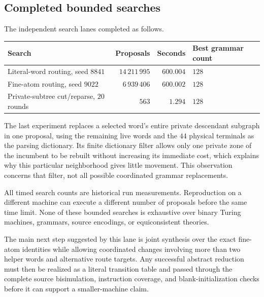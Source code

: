\subsection{Completed bounded searches}

The independent search lanes completed as follows.
\begin{center}
\begin{tabular}{@{}lrrl@{}}
\toprule
Search & Proposals & Seconds & Best grammar count\\
\midrule
Literal-word routing, seed $8841$ & $14\,211\,995$ & $600.004$ & $128$\\
Fine-atom routing, seed $9022$ & $6\,939\,406$ & $600.002$ & $128$\\
Private-subtree cut/reparse, $20$ rounds & $563$ & $1.294$ & $128$\\
\bottomrule
\end{tabular}
\end{center}
The last experiment replaces a selected word's entire private descendant
subgraph in one proposal, using the remaining live words and the $44$
physical terminals as the parsing dictionary. Its finite dictionary filter
allows only one private zone of the incumbent to be rebuilt without
increasing its immediate cost, which explains why this particular
neighborhood gives little movement. This observation concerns that filter,
not all possible coordinated grammar replacements.

All timed search counts are historical run measurements. Reproduction on a
different machine can execute a different number of proposals before the
same time limit. None of these bounded searches is exhaustive over binary
Turing machines, grammars, source encodings, or equiconsistent theories.

The main next step suggested by this lane is joint synthesis over the
exact fine-atom identities while allowing coordinated changes involving
more than two helper words and alternative route targets. Any successful
abstract reduction must then be realized as a literal transition table and
passed through the complete source bisimulation, instruction coverage, and
blank-initialization checks before it can support a smaller-machine claim.
